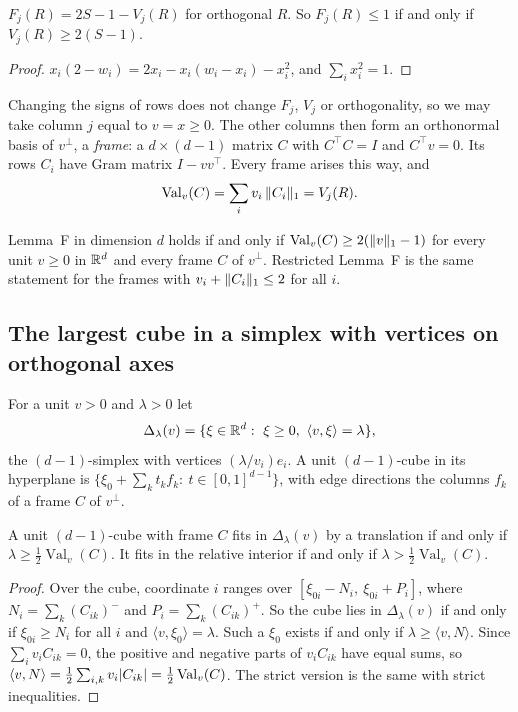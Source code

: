 \documentclass[11pt,a4paper]{article}
\newcommand{\status}[1]{\textsf{\small[#1]}}
\newcommand{\Val}{\operatorname{Val}}
\begin{document}
\begin{lemma}[\status{Lean}]\label{lem:value}
$F_j(R)=2S-1-V_j(R)$ for orthogonal $R$. So $F_j(R)\le1$ if and only if $V_j(R)\ge 2(S-1)$.
\end{lemma}
\begin{proof}
$x_i(2-w_i)=2x_i-x_i(w_i-x_i)-x_i^2$, and $\sum_ix_i^2=1$.
\end{proof}

Changing the signs of rows does not change $F_j$, $V_j$ or orthogonality, so we may take column $j$ equal to $v=x\ge0$. The other columns then form an orthonormal basis of $v^\perp$, a \emph{frame}: a $d\times(d-1)$ matrix $C$ with $C^\top C=I$ and $C^\top v=0$. Its rows $C_i$ have Gram matrix $I-vv^\top$. Every frame arises this way, and
\[
\Val_v(C)=\sum_i v_i\,\norm{C_i}_1=V_j(R).
\]
\begin{corollary}\label{cor:frame}
Lemma~F in dimension $d$ holds if and only if $\Val_v(C)\ge 2(\norm v_1-1)$ for every unit $v\ge0$ in $\mathbb R^d$ and every frame $C$ of $v^\perp$. Restricted Lemma~F is the same statement for the frames with $v_i+\lVert C_i\rVert_1\le 2$ for all $i$.
\end{corollary}

\subsection{The largest cube in a simplex with vertices on orthogonal axes}\label{sec:simplex}
For a unit $v>0$ and $\lambda>0$ let
\[
\Delta_\lambda(v)=\{\xi\in\R^d:\ \xi\ge0,\ \langle v,\xi\rangle=\lambda\},
\]
the $(d-1)$-simplex with vertices $(\lambda/v_i)e_i$. A unit $(d-1)$-cube in its hyperplane is $\{\xi_0+\sum_kt_kf_k:\ t\in[0,1]^{d-1}\}$, with edge directions the columns $f_k$ of a frame $C$ of $v^\perp$.

\begin{theorem}[\status{proof}]\label{thm:simplex}
A unit $(d-1)$-cube with frame $C$ fits in $\Delta_\lambda(v)$ by a translation if and only if $\lambda\ge\frac12\Val_v(C)$. It fits in the relative interior if and only if $\lambda>\frac12\Val_v(C)$.
\end{theorem}
\begin{proof}
Over the cube, coordinate $i$ ranges over $[\xi_{0i}-N_i,\ \xi_{0i}+P_i]$, where $N_i=\sum_k(C_{ik})^-$ and $P_i=\sum_k(C_{ik})^+$. So the cube lies in $\Delta_\lambda(v)$ if and only if $\xi_{0i}\ge N_i$ for all $i$ and $\langle v,\xi_0\rangle=\lambda$. Such a $\xi_0$ exists if and only if $\lambda\ge\langle v,N\rangle$. Since $\sum_iv_iC_{ik}=0$, the positive and negative parts of $v_iC_{ik}$ have equal sums, so $\langle v,N\rangle=\frac12\sum_{i,k}v_i\abs{C_{ik}}=\frac12\Val_v(C)$. The strict version is the same with strict inequalities.
\end{proof}
\end{document}
